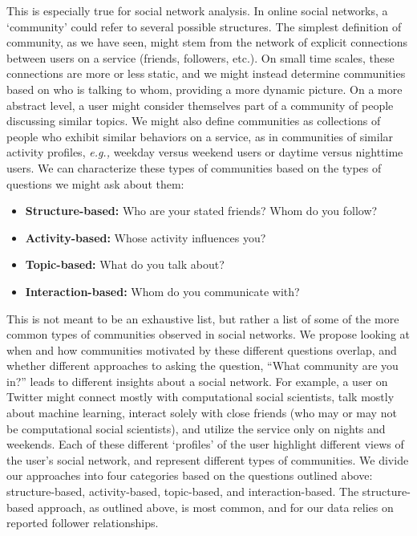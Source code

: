 This is especially true for social network analysis. In online social networks, a `community' could refer to several possible structures. The simplest definition of community, as we have seen, might stem from the network of explicit connections between users on a service (friends, followers, etc.). On small time scales, these connections are more or less static, and we might instead determine communities based on who is talking to whom, providing a more dynamic picture. On a more abstract level, a user might consider themselves part of a community of people discussing similar topics. We might also define communities as collections of people who exhibit similar behaviors on a service, as in communities of similar activity profiles, \emph{e.g.,} weekday versus weekend users or daytime versus nighttime users. We can characterize these types of communities based on the types of questions we might ask about them:
\begin{itemize}
	\item \textbf{Structure-based:} Who are your stated friends? Whom do you follow?
	\item \textbf{Activity-based:} Whose activity influences you?
	\item \textbf{Topic-based:} What do you talk about?
	\item \textbf{Interaction-based:} Whom do you communicate with?
\end{itemize}

This is not meant to be an exhaustive list, but rather a list of some of the more common types of communities observed in social networks. We propose looking at when and how communities motivated by these different questions overlap, and whether different approaches to asking the question, ``What community are you in?'' leads to different insights about a social network. For example, a user on Twitter might connect mostly with computational social scientists, talk mostly about machine learning, interact solely with close friends (who may or may not be computational social scientists), and utilize the service only on nights and weekends. Each of these different `profiles' of the user highlight different views of the user's social network, and represent different types of communities. We divide our approaches into four categories based on the questions outlined above: structure-based, activity-based, topic-based, and interaction-based. The structure-based approach, as outlined above, is most common, and for our data relies on reported follower relationships.

